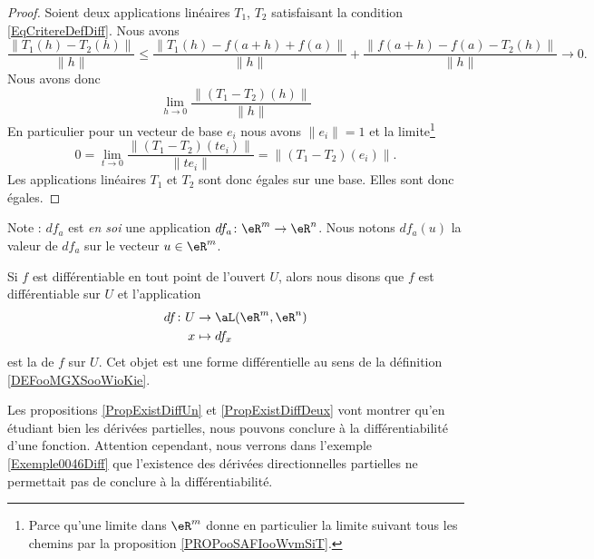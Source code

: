 \begin{proof}
    Soient deux applications linéaires \( T_1\), \( T_2\) satisfaisant la condition \eqref{EqCritereDefDiff}. Nous avons
    \begin{equation}
        \frac{ \| T_1(h)-T_2(h) \| }{ \| h \| }\leq \frac{ \| T_1(h)-f(a+h)+f(a) \| }{ \| h \| }+\frac{ \| f(a+h)-f(a)-T_2(h) \| }{ \| h \| }\to 0.
    \end{equation}
    Nous avons donc
    \begin{equation}
        \lim_{h\to 0} \frac{ \| (T_1-T_2)(h) \| }{ \| h \| }
    \end{equation}
    En particulier pour un vecteur de base \( e_i\) nous avons \( \| e_i \|=1\) et la limite\footnote{Parce qu'une limite dans \( \eR^m\) donne en particulier la limite suivant tous les chemins par la proposition \ref{PROPooSAFIooWvmSiT}.}
    \begin{equation}
        0=\lim_{t\to 0} \frac{ \| (T_1-T_2)(te_i) \| }{ \| te_i \| }=\| (T_1-T_2)(e_i) \|.
    \end{equation}
    Les applications linéaires \( T_1\) et \( T_2\) sont donc égales sur une base. Elles sont donc égales.
\end{proof}

Note : $df_a$ est \emph{en soi} une application $df_a\colon \eR^m\to \eR^n$. Nous notons $df_a(u)$ la valeur de $df_a$ sur le vecteur $u\in\eR^m$.

Si \( f\) est différentiable en tout point de l'ouvert \( U\), alors nous disons que \( f\) est différentiable sur \( U\) et l'application
\begin{equation}
    \begin{aligned}
        df\colon U&\to \aL(\eR^m,\eR^n) \\
        x&\mapsto df_x 
    \end{aligned}
\end{equation}
est la  de \( f\) sur \( U\). Cet objet est une forme différentielle au sens de la définition \ref{DEFooMGXSooWioKie}.

Les propositions \ref{PropExistDiffUn} et \ref{PropExistDiffDeux} vont montrer qu'en étudiant bien les dérivées partielles, nous pouvons conclure à la différentiabilité d'une fonction.
Attention cependant, nous verrons dans l'exemple \ref{Exemple0046Diff} que l'existence des dérivées directionnelles partielles ne permettait pas de conclure à la différentiabilité. 

